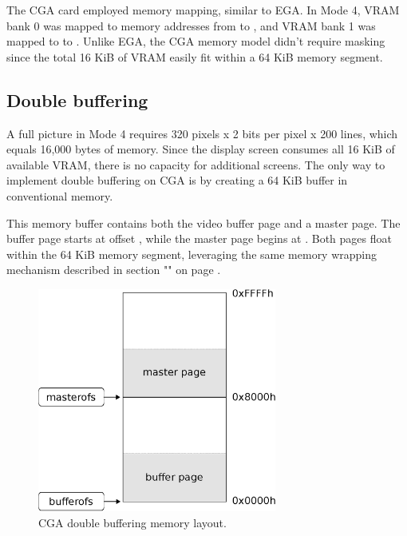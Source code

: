 \documentclass[book.tex]{subfiles}
\begin{document}
\par
The CGA card employed memory mapping, similar to EGA. In Mode 4, VRAM bank 0 was mapped to memory addresses from  to , and VRAM bank 1 was mapped to  to . Unlike EGA, the CGA memory model didn't require masking since the total 16 KiB of VRAM easily fit within a 64 KiB memory segment.



\subsection{Double buffering}
A full picture in Mode 4 requires 320 pixels x 2 bits per pixel x 200 lines, which equals 16,000 bytes of memory. Since the display screen consumes all 16 KiB of available VRAM, there is no capacity for additional screens. The only way to implement double buffering on CGA is by creating a 64 KiB buffer in conventional memory.\\

\par
\begin{minipage}{\textwidth}
  
\end{minipage}
\label{state_type}
\par
This memory buffer contains both the video buffer page and a master page. The buffer page starts at offset , while the master page begins at . Both pages float within the 64 KiB memory segment, leveraging the same memory wrapping mechanism described in section "" on page \pageref{section:wrap_ega_memory}.\\

\begin{figure}[H]
\centering
\includegraphics[width=0.7\textwidth]{imgs/drawings/cga_screenseg.eps}
\caption{CGA double buffering memory layout.}
\label{fig:cga_screenseg}
\end{figure}
\end{document}
